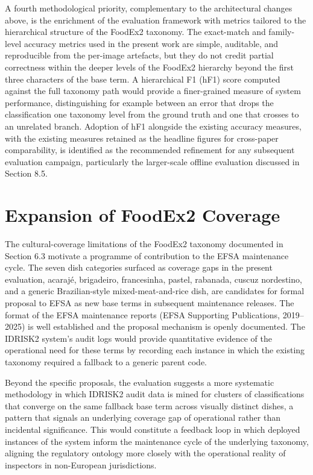 A fourth methodological priority, complementary to the architectural changes above, is the enrichment of the evaluation framework with metrics tailored to the hierarchical structure of the FoodEx2 taxonomy. The exact-match and family-level accuracy metrics used in the present work are simple, auditable, and reproducible from the per-image artefacts, but they do not credit partial correctness within the deeper levels of the FoodEx2 hierarchy beyond the first three characters of the base term. A hierarchical F1 (hF1) score computed against the full taxonomy path would provide a finer-grained measure of system performance, distinguishing for example between an error that drops the classification one taxonomy level from the ground truth and one that crosses to an unrelated branch. Adoption of hF1 alongside the existing accuracy measures, with the existing measures retained as the headline figures for cross-paper comparability, is identified as the recommended refinement for any subsequent evaluation campaign, particularly the larger-scale offline evaluation discussed in Section 8.5.

\hypertarget{expansion-of-foodex2-coverage}{%
\section{Expansion of FoodEx2 Coverage}\label{expansion-of-foodex2-coverage}}

The cultural-coverage limitations of the FoodEx2 taxonomy documented in Section 6.3 motivate a programme of contribution to the EFSA maintenance cycle. The seven dish categories surfaced as coverage gaps in the present evaluation, acarajé, brigadeiro, francesinha, pastel, rabanada, cuscuz nordestino, and a generic Brazilian-style mixed-meat-and-rice dish, are candidates for formal proposal to EFSA as new base terms in subsequent maintenance releases. The format of the EFSA maintenance reports (EFSA Supporting Publications, 2019--2025) is well established and the proposal mechanism is openly documented. The IDRISK2 system's audit logs would provide quantitative evidence of the operational need for these terms by recording each instance in which the existing taxonomy required a fallback to a generic parent code.

Beyond the specific proposals, the evaluation suggests a more systematic methodology in which IDRISK2 audit data is mined for clusters of classifications that converge on the same fallback base term across visually distinct dishes, a pattern that signals an underlying coverage gap of operational rather than incidental significance. This would constitute a feedback loop in which deployed instances of the system inform the maintenance cycle of the underlying taxonomy, aligning the regulatory ontology more closely with the operational reality of inspectors in non-European jurisdictions.

